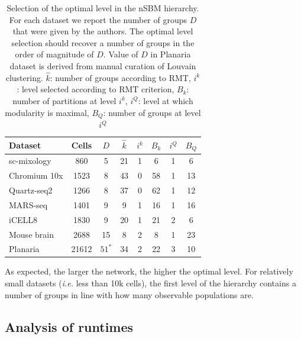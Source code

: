 \documentclass[10pt]{article}
\begin{document}
\begin{table}[h!]
\centering
 \begin{tabular}{|| l c c c c c c c ||}
 \hline
 \textbf{Dataset} & \textbf{Cells} & \textbf{$D$}  & \textbf{$\hat{k}$} & \textbf{$i^k$} & \textbf{$B_k$} & \textbf{$i^Q$} & \textbf{$B_Q$} \\ [0.5ex] 

 \hline\hline
 sc-mixology \cite{Tian_2019} & 860 & 5  & 21 & 1 & 6 & 1 & 6 \\ 
\hline
 Chromium 10x \cite{mereu_2020} & 1523 & 8  & 43 & 0 & 58 & 1 & 13 \\
 \hline
 Quartz-seq2 \cite{mereu_2020} & 1266 & 8  & 37 & 0 & 62 & 1 & 12 \\
 \hline
 MARS-seq \cite{mereu_2020} & 1401 & 9  & 9 & 1 & 16 & 1 & 16 \\
 \hline
 iCELL8 \cite{mereu_2020} & 1830 & 9  & 20 & 1 & 21 & 2 & 6 \\
 \hline
 Mouse brain \cite{Gracia_Villacampa_2020} & 2688 & 15  & 8 & 2 & 8 & 1 & 23 \\
 \hline
 Planaria \cite{plass_2018} & 21612 & $51^\ast$ & 34 & 2 & 22 & 3 & 10 \\
 \hline
\end{tabular}
\caption{Selection of the optimal level in the nSBM hierarchy. For each dataset we report the number of groups $D$ that were given by the authors. The optimal level selection should recover a number of groups in the order of magnitude of $D$. Value of $D$ in Planaria dataset is derived from manual curation of Louvain clustering. $\hat{k}$:  number of groups according to RMT, $i^k$: level selected according to RMT criterion, $B_k$: number of partitions at level $i^k$, $i^Q$: level at which modularity is maximal, $B_Q$: number of groups at level $i^Q$}
\label{table_optimal}
\end{table}

As expected, the larger the network, the higher the optimal level. For relatively small datasets (\emph{i.e.} less than 10k cells), the first level of the hierarchy contains a number of groups in line with how many observable populations are. 



\subsection*{Analysis of runtimes}
\end{document}
